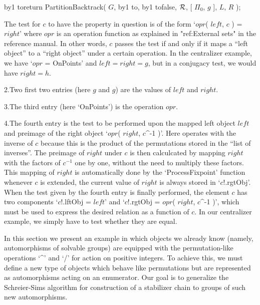{\newcount\lineno%
 \def\){\advance\lineno by1 \begingroup\obeylines\cloparen%
        \hbox to\manindent{\hfil $\scriptstyle\the\lineno$\enspace}}%
\)return PartitionBacktrack( $G$,
\)\quad [ $g$, $g$,
\)\qquad OnPoints,
\)\qquad $c$ -> $c$!.lftObj = $c$!.rgtObj ],
\)\quad false, ${\cal R}$, [ $\Pi_0$, $g$ ], $L$, $R$ );
  \vadjust{\allowbreak}%

}%
The test for $c$ to have the property in question  is of the form `$opr$(
$left$,  $c$  )  =  $right$' where  $opr$   is an  operation  function as
explained in "ref:External sets" in the reference manual. In other words,
$c$ passes the test if and only if it maps a ``left object'' to a ``right
object'' under  a certain operation. In  the centralizer example, we have
`$opr$ =  OnPoints' and $left = right  = g$, but  in a conjugacy test, we
would have $right = h$.

2.\enspace  Two first two  entries (here $g$ and  $g$)  are the values of
$left$ and $right$.

3.\enspace The third entry (here `OnPoints') is the operation $opr$.

4.\enspace The fourth  entry is the test to  be performed upon the mapped
left object $left$  and preimage  of  the right object `$opr$(   $right$,
$c$^-1 )'.  Here {\GAP} operates with the  inverse of $c$ because this is
the product of  the permutations stored  in the ``list of inverses''. The
preimage of $right$ under $c$ is then calculcated by mapping $right$ with
the factors  of $c^{-1}$ one by one,  without the need  to multiply these
factors.    This mapping  of  $right$  is     automatically done by   the
`ProcessFixpoint' function whenever $c$ is extended, the current value of
$right$ is always  stored  in `$c$!.rgtObj'.  When the test  given by the
fourth entry  is finally performed,   the element $c$  has two components
`$c$!.lftObj =  $left$' and `$c$!.rgtObj  =   $opr$( $right$, $c$^-1  )',
which must be used to express the desired  relation as a function of $c$.
In our  centralizer  example, we simply  have  to test   whether they are
equal.

\endgroup%

\null

In this section  we present an example in  which objects we  already know
(namely,  automorphisms  of   solvable  groups)   are  equipped  with the
permutation-like operations `^' and `/'  for action on positive integers.
To achieve this, we must  define a new  type of objects which behave like
permutations   but are  represented     as automorphisms  acting  on   an
enumerator.  Our  goal is to  generalize  the Schreier-Sims algorithm for
construction of a stabilizer chain to groups of such new automorphisms.

